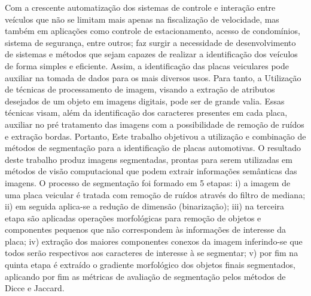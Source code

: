 \documentclass[
	12pt,				%
    oneside,			%
	a4paper,			%
	english,			%
	french,				%
	spanish,			%
	brazil,				%
	]{abntex2}
\begin{document}
\frenchspacing 


	\imprimircapa

\imprimirfolhaderosto*
	



\begin{resumo} %

Com a crescente automatização dos sistemas de controle e interação entre veículos que não se limitam mais apenas na fiscalização de velocidade, mas também em aplicações como controle de estacionamento, acesso de condomínios, sistema de segurança, entre outros; faz surgir a necessidade de desenvolvimento de sistemas e métodos que sejam capazes de realizar a identificação dos veículos de forma simples e eficiente. Assim, a identificação das placas veiculares pode auxiliar na tomada de dados para os mais diversos usos. Para tanto, a Utilização de técnicas de processamento de imagem, visando a extração de atributos desejados de um objeto em imagens digitais, pode ser de grande valia. Essas técnicas visam, além da identificação dos caracteres presentes em cada placa, auxiliar no pré tratamento das imagens com a possibilidade de remoção de ruídos e extração bordas. Portanto, Este trabalho objetivou a utilização e combinação de métodos de segmentação para a identificação de placas automotivas. O resultado deste trabalho produz imagens segmentadas, prontas para serem utilizadas em métodos de visão computacional que podem extrair informações semânticas das imagens. O processo de segmentação foi formado em 5 etapas: i) a imagem de uma placa veicular é tratada com remoção de ruídos através do filtro de mediana; ii) em seguida aplica-se a redução de dimensão (binarização); iii) na terceira etapa são aplicadas operações morfológicas para remoção de objetos e componentes pequenos que não correspondem às informações de interesse da placa; iv) extração dos maiores componentes conexos da imagem inferindo-se que todos serão respectivos aos caracteres de interesse à se segmentar; v) por fim na quinta etapa é extraído o gradiente morfológico dos objetos finais segmentados, aplicando por fim as métricas de avaliação de segmentação pelos métodos de Dicce e Jaccard.



\end{resumo}
\end{document}
